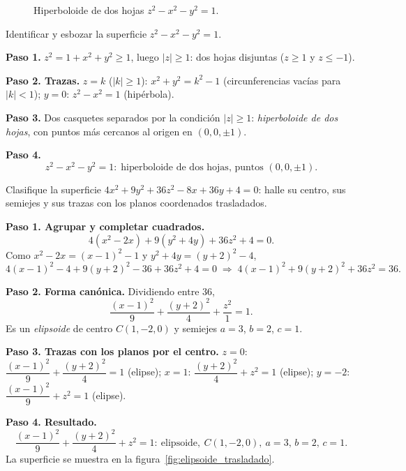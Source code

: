 \begin{figure}[!htbp]
\centering
{}
\caption{Hiperboloide de dos hojas $z^2-x^2-y^2=1$.}
\label{fig:hiperboloide_dos_hojas}
\end{figure}

\begin{example}
Identificar y esbozar la superficie $z^2 - x^2 - y^2 = 1$.
\begin{myproof}
\textbf{Paso 1.} $z^2=1+x^2+y^2\ge 1$, luego $|z|\ge 1$: dos hojas
disjuntas ($z\ge 1$ y $z\le -1$).

\textbf{Paso 2. Trazas.}
$z=k$ ($|k|\ge1$): $x^2+y^2=k^2-1$ (circunferencias vacías para $|k|<1$);
$y=0$: $z^2-x^2=1$ (hipérbola).

\textbf{Paso 3.} Dos casquetes separados por la condición $|z|\ge 1$:
\emph{hiperboloide de dos hojas}, con puntos más cercanos al origen en
$(0,0,\pm1)$.

\textbf{Paso 4.}
\[\boxed{z^2-x^2-y^2=1:\;\text{hiperboloide de dos hojas, puntos }(0,0,\pm1).}\]
\end{myproof}
\end{example}

\begin{example}
Clasifique la superficie $4x^2+9y^2+36z^2-8x+36y+4=0$: halle su centro, sus
semiejes y sus trazas con los planos coordenados trasladados.
\begin{myproof}
\textbf{Paso 1. Agrupar y completar cuadrados.}
\[
  4(x^2-2x)+9(y^2+4y)+36z^2+4=0.
\]
Como $x^2-2x=(x-1)^2-1$ y $y^2+4y=(y+2)^2-4$,
\[
  4(x-1)^2-4+9(y+2)^2-36+36z^2+4=0
  \;\Rightarrow\; 4(x-1)^2+9(y+2)^2+36z^2=36.
\]

\textbf{Paso 2. Forma canónica.}
Dividiendo entre $36$,
\[
  \frac{(x-1)^2}{9}+\frac{(y+2)^2}{4}+\frac{z^2}{1}=1.
\]
Es un \emph{elipsoide} de centro $C(1,-2,0)$ y semiejes $a=3$, $b=2$, $c=1$.

\textbf{Paso 3. Trazas con los planos por el centro.}
$z=0$: $\dfrac{(x-1)^2}{9}+\dfrac{(y+2)^2}{4}=1$ (elipse);
$x=1$: $\dfrac{(y+2)^2}{4}+z^2=1$ (elipse);
$y=-2$: $\dfrac{(x-1)^2}{9}+z^2=1$ (elipse).

\textbf{Paso 4. Resultado.}
\[
  \boxed{\ \frac{(x-1)^2}{9}+\frac{(y+2)^2}{4}+z^2=1:\ \text{elipsoide},\
  C(1,-2,0),\ a=3,\,b=2,\,c=1.\ }
\]
La superficie se muestra en la figura~\ref{fig:elipsoide_trasladado}.
\end{myproof}
\end{example}

